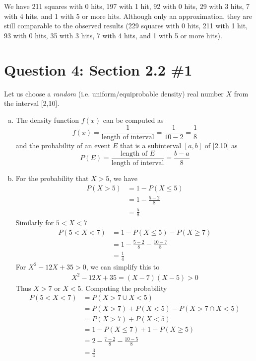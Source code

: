 \documentclass[11pt, oneside]{article}   	%
\begin{document}
We have 211 squares with 0 hits, 197 with 1 hit, 92 with 0 hits, 29 with 3 hits, 7 with 4 hits, and 1 with 5 or more hits. Although only an approximation, they are still comparable to the observed results (229 squares with 0 hits, 211 with 1 hit, 93 with 0 hits, 35 with 3 hits, 7 with 4 hits, and 1 with 5 or more hits).

\section*{Question 4: Section 2.2 \#1}

Let us choose a \textit{random} (i.e. uniform/equiprobable density) real number $X$ from the interval [2,10].
\begin{enumerate}[(a)]
	\item The density function $f(x)$ can be computed as
	$$f(x) = \frac{1}{\text{length of interval}} = \frac{1}{10-2} = \frac{1}{8}$$
	and the probability of an event $E$ that is a subinterval $[a,b]$ of [2.10] as
	$$P(E) = \frac{\text{length of } E}{\text{length of interval}} = \frac{b-a}{8}$$
	
	\item For the probability that $X>5$, we have
	\begin{align*}
		P(X>5) & = 1 - P(X \leq 5) \\
		& = 1 - \frac{5-2}{8} \\
		& = \frac{5}{8}
	\end{align*}
	Similarly for $5 < X < 7$
	\begin{align*}
		P(5 < X < 7) & = 1 - P(X \leq 5) - P(X \geq 7) \\
		& = 1 - \frac{5-2}{8} - \frac{10-7}{8} \\
		& = \frac{1}{4}
	\end{align*}
	For $X^2-12X+35>0$, we can simplify this to
	\begin{align*}
		X^2-12X+35 = (X-7)(X-5) > 0
	\end{align*}
	Thus $X>7$ or $X<5$. Computing the probability
	\begin{align*}
		P(5 < X < 7) & = P(X > 7 \cup X <5) \\
		& = P(X > 7) + P(X<5) - P(X> 7 \cap X < 5) \\
		& = P(X > 7) + P(X<5) \\
		& = 1 - P(X \leq 7) + 1 - P(X \geq 5) \\
		& = 2 - \frac{7-2}{8} - \frac{10-5}{8} \\
		& = \frac{3}{4}
	\end{align*}
\end{enumerate}
\end{document}
